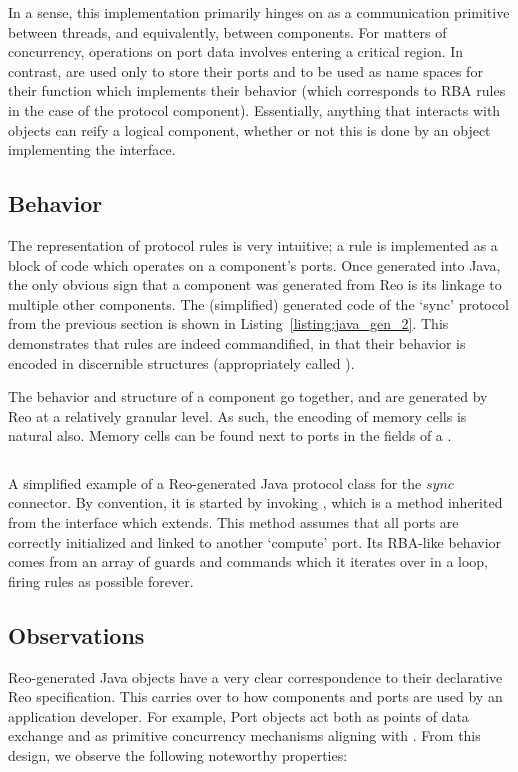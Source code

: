 In a sense, this implementation primarily hinges on  as a communication primitive between threads, and equivalently, between components. For matters of concurrency, operations on port data involves entering a critical region. In contrast,  are used only to store their ports and to be used as name spaces for their  function which implements their behavior (which corresponds to RBA rules in the case of the protocol component). Essentially, anything that interacts with  objects can reify a logical component, whether or not this is done by an object implementing the  interface.

\subsection{Behavior}
The representation of protocol rules is very intuitive; a rule is implemented as a block of code which operates on a component's ports. Once generated into Java, the only obvious sign that a component was generated from Reo is its linkage to multiple other components. The (simplified) generated  code of the `sync' protocol from the previous section is shown in Listing~\ref{listing:java_gen_2}. This demonstrates that rules are indeed commandified, in that their behavior is encoded in discernible structures (appropriately called ).

The behavior and structure of a component go together, and are generated by Reo at a relatively granular level. As such, the encoding of memory cells is natural also. Memory cells can be found next to ports in the fields of a .

\begin{listing}[h!]
	\centering
	\inputminted{java}{java_gen_2.java}
	\caption[Reo-generated Java protocol class of the sync connector.]{A simplified example of a Reo-generated Java protocol class for the $sync$ connector. By convention, it is started by invoking , which is a method inherited from the  interface which  extends. This method assumes that all ports are correctly initialized and linked to another `compute' port. Its RBA-like behavior comes from an array of guards and commands which it iterates over in a loop, firing rules as possible forever.}
	\label{listing:java_gen_2}
\end{listing}

\subsection{Observations}
\label{sec:java_observations}
Reo-generated Java objects have a very clear correspondence to their declarative Reo specification. This carries over to how components and ports are used by an application developer. For example, Port objects act both as points of data exchange and as primitive concurrency mechanisms aligning  with . From this design, we observe the following noteworthy properties:

